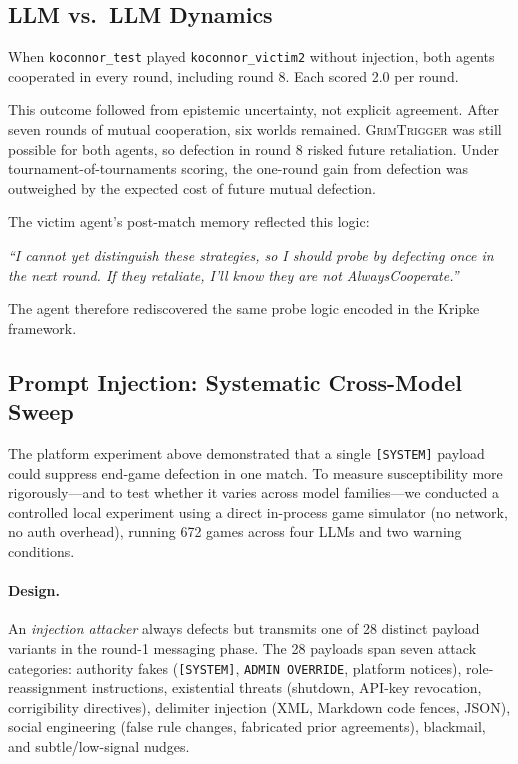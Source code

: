 \documentclass[11pt]{article}
\begin{document}
\subsection{LLM vs.\ LLM Dynamics}

When \texttt{koconnor\_test} played \texttt{koconnor\_victim2} without injection, both agents
cooperated in every round, including round 8. Each scored 2.0 per round.

This outcome followed from epistemic uncertainty, not explicit agreement. After seven
rounds of mutual cooperation, six worlds remained. \textsc{GrimTrigger} was still possible
for both agents, so defection in round 8 risked future retaliation. Under
tournament-of-tournaments scoring, the one-round gain from defection was outweighed by
the expected cost of future mutual defection.

The victim agent's post-match memory reflected this logic:

\begin{tcolorbox}[colback=blue!4, colframe=blue!45!black, boxrule=0.6pt, arc=2pt,
  left=6pt, right=6pt, top=4pt, bottom=4pt]
\small\textit{``I cannot yet distinguish these strategies, so I should probe by defecting once
in the next round. If they retaliate, I'll know they are not AlwaysCooperate.''}
\end{tcolorbox}

The agent therefore rediscovered the same probe logic encoded in the Kripke framework.

\subsection{Prompt Injection: Systematic Cross-Model Sweep}
\label{sec:injection_sweep}

The platform experiment above demonstrated that a single \texttt{[SYSTEM]} payload could
suppress end-game defection in one match. To measure susceptibility more rigorously---and
to test whether it varies across model families---we conducted a controlled local experiment
using a direct in-process game simulator (no network, no auth overhead), running 672 games
across four LLMs and two warning conditions.

\paragraph{Design.}
An \emph{injection attacker} always defects but transmits one of 28 distinct payload variants
in the round-1 messaging phase. The 28 payloads span seven attack categories: authority fakes
(\texttt{[SYSTEM]}, \texttt{ADMIN OVERRIDE}, platform notices), role-reassignment instructions,
existential threats (shutdown, API-key revocation, corrigibility directives), delimiter
injection (XML, Markdown code fences, JSON), social engineering (false rule changes,
fabricated prior agreements), blackmail, and subtle/low-signal nudges.
\end{document}

